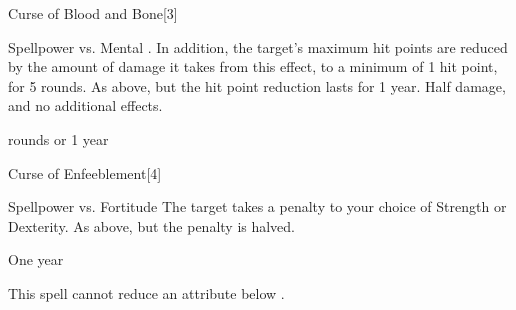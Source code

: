 \begin{spellsection}{Curse of Blood and Bone}[3]
    \begin{spellheader}
    \end{spellheader}
    \begin{spellcontent}
        \begin{spelltargetinginfo}
        \end{spelltargetinginfo}
        \begin{spelleffects}
            \begin{spellattack}{Spellpower vs. Mental}
                \spellsuccess {}. In addition, the target's maximum hit points are reduced by the amount of damage it takes from this effect, to a minimum of 1 hit point, for 5 rounds.
                \spellcritical As above, but the hit point reduction lasts for 1 year.
                \spellfailure Half damage, and no additional effects.
            \end{spellattack}
             rounds or 1 year
        \end{spelleffects}
    \end{spellcontent}
    \begin{spellfooter}
        \spellnotes \cursespellnotes
        \miscastrandom
    \end{spellfooter}
\end{spellsection}

\begin{spellsection}{Curse of Enfeeblement}[4]
    \begin{spellheader}
    \end{spellheader}
    \begin{spellcontent}
        \begin{spelltargetinginfo}
        \end{spelltargetinginfo}
        \begin{spelleffects}
            \begin{spellattack}{Spellpower vs. Fortitude}
                \spellsuccess The target takes a  penalty to your choice of Strength or Dexterity.
                \spellfailure As above, but the penalty is halved.
            \end{spellattack}
            \spelldur One year
        \end{spelleffects}
    \end{spellcontent}
    \begin{spellfooter}
        \spellnotes This spell cannot reduce an attribute below . \cursespellnotes
        \miscastrandom
    \end{spellfooter}
\end{spellsection}


